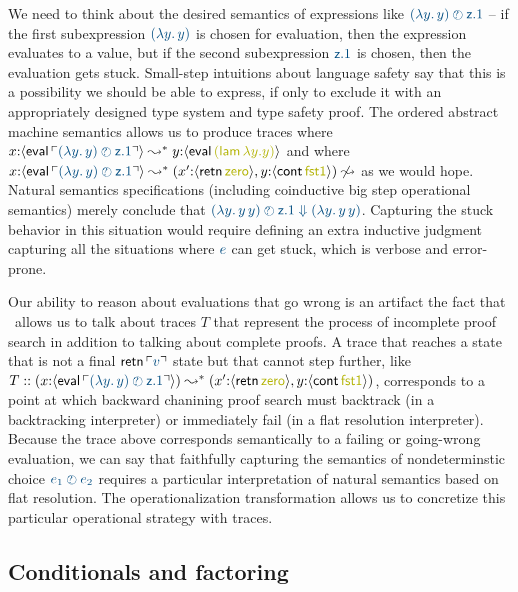 We need to think about the desired semantics of 
expressions like $\obj{(\lambda y.\,y)
\arb {\sf z}.1}$ -- if the first subexpression $\obj{(\lambda y.\,y)}$ is
chosen for evaluation, then the expression evaluates to a value, but
if the second subexpression $\obj{{\sf z}.1}$ is chosen, then the evaluation
gets stuck. Small-step
intuitions about language safety say that this is a possibility we should
be able to express, if only to exclude it with an appropriately
designed type system and type safety proof. The ordered abstract
machine semantics allows us to produce traces where
%
$x{:}\susp{{\sf eval}\, \interp{(\lambda y.\,y) \arb {\sf z}.1}} \leadsto^* 
 y{:}\susp{{\sf eval}\, \lf{({\sf lam}\,\lambda y.y)}}$
%
and where
%
$x{:}\susp{{\sf eval}\,\interp{(\lambda y.\,y) \arb {\sf z}.1}} \leadsto^* 
 (x'{:}\susp{{\sf retn}\,\lf{\sf zero}}, y{:}\susp{{\sf cont}\,\lf{\sf fst1}})
 \not\leadsto$
%
as we would hope. Natural semantics specifications (including
coinductive big step operational semantics) merely conclude
that $\obj{(\lambda y.\,y\,y) \arb {\sf z}.1 \Downarrow (\lambda
y.\,y\,y)}$. Capturing the stuck behavior in this situation 
would require defining an extra inductive judgment capturing 
all the situations where $\obj{e}$ can get stuck, which is 
verbose and error-prone.

Our ability to reason about evaluations that go wrong is an
artifact the fact that \sls~allows us to talk about traces $T$ 
that represent the process of incomplete proof search 
in addition to talking about complete proofs. 
A trace that reaches a state that is not a final ${\sf retn}\,\interp{v}$
state but that cannot step further, like 
$T :: (x{:}\susp{{\sf eval}\,\interp{(\lambda y.\,y) \arb {\sf z}.1}})
 \leadsto^* 
 (x'{:}\susp{{\sf retn}\,\lf{\sf zero}}, y{:}\susp{{\sf cont}\,\lf{\sf fst1}})$,
corresponds to a point at which backward chanining proof search
must backtrack (in a backtracking interpreter) or immediately 
fail (in a flat resolution interpreter). Because the trace above corresponds
semantically to a failing or going-wrong evaluation, 
we can say that faithfully capturing the semantics of nondeterminstic
choice $\obj{e_1 \arb e_2}$ requires a particular interpretation of
natural semantics based on flat resolution. The operationalization
transformation allows us to concretize this particular operational strategy
with traces.

\subsection{Conditionals and factoring}
\label{sec:choicecase}

